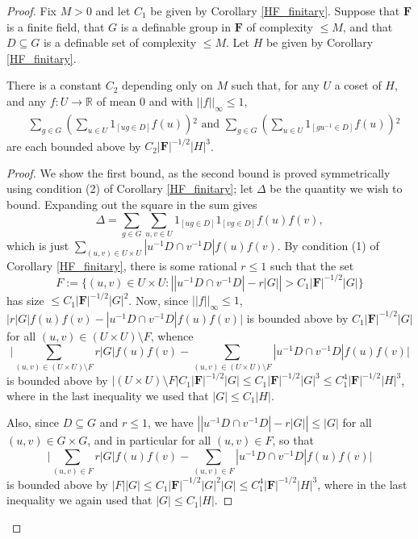 \documentclass[10pt,a4paper]{amsart}
\begin{document}
\begin{proof}
    Fix $M>0$ and let $C_1$ be given by Corollary \ref{HF_finitary}. Suppose that $\mathbf{F}$ is a finite field, that $G$ is a definable group in $\mathbf{F}$ of complexity $\leqslant M$, and that $D\subseteq G$ is a definable set of complexity $\leqslant M$. Let $H$ be given by Corollary \ref{HF_finitary}.

\begin{claim}\label{mean_0_individual}
    There is a constant $C_2$ depending only on $M$ such that, for any $U$ a coset of $H$, and any $f:U\to\mathbb{R}$ of mean $0$ and with $||f||_\infty\leqslant 1$,
    \begin{align*}
        &\sum_{g\in G}\left(\sum_{u\in U}1_{[ug\in D]}f(u)\right){}^2\text{ and }\sum_{g\in G}\left(\sum_{u\in U}1_{[gu^{-1}\in D]}f(u)\right){}^2
    \end{align*}are each bounded above by $C_2|\mathbf{F}|^{-1/2}|H|^3$.
\end{claim}
\begin{proof}
    We show the first bound, as the second bound is proved symmetrically using condition (2) of Corollary \ref{HF_finitary}; let $\Delta$ be the quantity we wish to bound. Expanding out the square in the sum gives $$\Delta=\sum_{g\in G}\sum_{u,v\in U}1_{[ug\in D]}1_{[vg\in D]}f(u)f(v),$$ which is just $\sum_{(u,v)\in U\times U}|u^{-1}D\cap v^{-1}D|f(u)f(v)$. By condition (1) of Corollary \ref{HF_finitary}, there is some rational $r\leqslant 1$ such that the set $$F:=\{(u,v)\in U\times U:\left||u^{-1}D\cap v^{-1}D|-r|G|\right|>C_1|\mathbf{F}|^{-1/2}|G|\}$$ has size $\leqslant C_1|\mathbf{F}|^{-1/2}|G|^2$. Now, since $||f||_\infty\leqslant 1$, $\big|r|G|f(u)f(v)-|u^{-1}D\cap v^{-1}D|f(u)f(v)\big|$ is bounded above by $C_1|\mathbf{F}|^{-1/2}|G|$ for all $(u,v)\in (U\times U)\setminus F$, whence $$\bigg|\sum_{(u,v)\in (U\times U)\setminus F}r|G|f(u)f(v)-\sum_{(u,v)\in (U\times U)\setminus F}|u^{-1}D\cap v^{-1}D|f(u)f(v)\bigg|$$ is bounded above by $|(U\times U)\setminus F|C_1|\mathbf{F}|^{-1/2}|G|\leqslant C_1|\mathbf{F}|^{-1/2}|G|^3\leqslant C_1^4|\mathbf{F}|^{-1/2}|H|^3$, where in the last inequality we used that $|G|\leqslant C_1|H|$.
    
    Also, since $D\subseteq G$ and $r\leqslant 1$, we have $\left||u^{-1}D\cap v^{-1}D|-r|G|\right|\leqslant |G|$ for all $(u,v)\in G\times G$, and in particular for all $(u,v)\in F$, so that $$\bigg|\sum_{(u,v)\in F}r|G|f(u)f(v)-\sum_{(u,v)\in  F}|u^{-1}D\cap v^{-1}D|f(u)f(v)\bigg|$$ is bounded above by $|F||G|\leqslant C_1|\mathbf{F}|^{-1/2}|G|^2|G|\leqslant C_1^4|\mathbf{F}|^{-1/2}|H|^3$, where in the last inequality we again used that $|G|\leqslant C_1|H|$.
    

\end{proof}
\end{proof}
\end{document}
